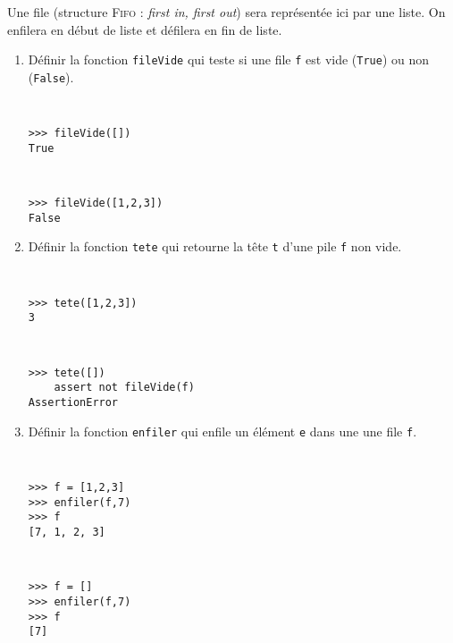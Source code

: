\begin{question} 
Une file (structure \textsc{Fifo} : \emph{first in, first out}) sera représentée ici par une liste. On enfilera en début de liste
et défilera en fin de liste.
\begin{enumerate}
\item Définir la fonction \texttt{fileVide} qui teste si une file \texttt{f}
	est vide (\texttt{True}) ou non (\texttt{False}).

\noindent\begin{minipage}[t]{6cm}\tt\footnotesize
\begin{Verbatim}
>>> fileVide([])
True
\end{Verbatim}
\end{minipage}
\hfill
\begin{minipage}[t]{6cm}\tt\footnotesize
\begin{Verbatim}
>>> fileVide([1,2,3])
False
\end{Verbatim}
\end{minipage}
\vspace*{2mm}
	
\item Définir la fonction \texttt{tete} qui retourne la tête \texttt{t}
	d'une pile \texttt{f} non vide.

\noindent\begin{minipage}[t]{6cm}\tt\footnotesize
\begin{Verbatim}
>>> tete([1,2,3])
3
\end{Verbatim}
\end{minipage}
\hfill
\begin{minipage}[t]{6cm}\tt\footnotesize
\begin{Verbatim}
>>> tete([])
    assert not fileVide(f)
AssertionError
\end{Verbatim}
\end{minipage}
\vspace*{2mm}
	
\item Définir la fonction \texttt{enfiler} qui enfile un élément \texttt{e}
	dans une une file \texttt{f}.

\noindent\begin{minipage}[t]{6cm}\tt\footnotesize
\begin{Verbatim}
>>> f = [1,2,3]
>>> enfiler(f,7)
>>> f
[7, 1, 2, 3]
\end{Verbatim}
\end{minipage}
\hfill
\begin{minipage}[t]{6cm}\tt\footnotesize
\begin{Verbatim}
>>> f = []
>>> enfiler(f,7)
>>> f
[7]
\end{Verbatim}
\end{minipage}
\vspace*{2mm}
	

\end{enumerate}
\end{question}
